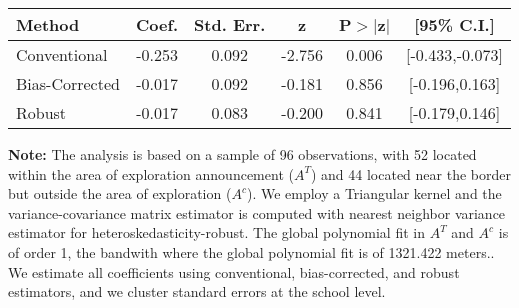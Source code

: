 \begin{table}[htbp]\centering
 \footnotesize 
\begin{tabular}{lccccc}
\hline\hline
Method & Coef. & Std. Err. & z & P$>|$z$|$ & [95\% C.I.] \\ 
\hline \hline  
Conventional & -0.253 & 0.092 & -2.756 & 0.006 & [-0.433,-0.073] \\ 
 Bias-Corrected & -0.017 & 0.092 & -0.181 & 0.856 & [-0.196,0.163] \\ 
Robust & -0.017 & 0.083 & -0.200 & 0.841 & [-0.179,0.146] \\ 
  \hline\hline
\end{tabular}
\label{table:rd}
\begin{tablenotes} 
  \justifying \tiny \textbf{Note: }    
   The analysis is based on a sample of 96 observations, with 52 located within the area of exploration announcement ($A^{T}$) and 44 located near the border but outside the area of exploration  ($A^{c}$). 
           We employ a Triangular kernel and the variance-covariance matrix estimator is computed with nearest neighbor variance estimator for heteroskedasticity-robust. The global polynomial fit in  $A^{T}$ and $A^{c}$ is of order 1, the bandwith where the global polynomial fit is of 1321.422 meters.. We estimate all coefficients using conventional, bias-corrected, and robust estimators, and we cluster standard errors at the school level. \end{tablenotes} 
 \end{table} 
